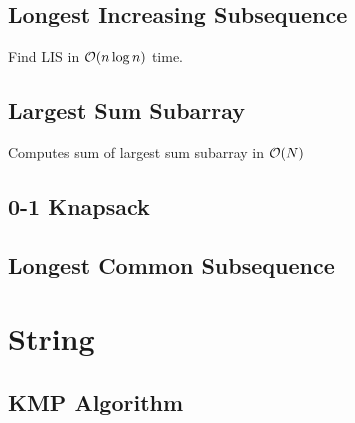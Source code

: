 \documentclass[landscape,8pt]{article}
\begin{document}
\begin{multicols}{2}
  \subsection{Longest Increasing Subsequence}
    Find LIS in $\order{n \log n}$ time.
      

  \subsection{Largest Sum Subarray}
    Computes sum of largest sum subarray in $\order{N}$
      

  \subsection{0-1 Knapsack}
    
  \subsection{Longest Common Subsequence}
    





\section{String}
  \subsection{KMP Algorithm}
    

\end{multicols}
\end{document}
